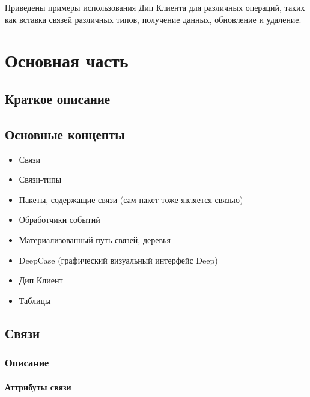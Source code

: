 \documentclass{article}
\begin{document}
Приведены примеры использования Дип Клиента для различных операций, таких как
вставка связей различных типов, получение данных, обновление и удаление.


\tableofcontents

\section{Основная часть}

\subsection{Краткое описание}

\subsection{Основные концепты}

\begin{itemize}
  \item Связи
  \item Связи-типы
  \item Пакеты, содержащие связи (сам пакет тоже является связью)
  \item Обработчики событий
  \item Материализованный путь связей, деревья
  \item DeepCase (графический визуальный интерфейс Deep)
  \item Дип Клиент
  \item Таблицы
\end{itemize}

\subsection{Связи}

\subsubsection{Описание}

\paragraph{Аттрибуты связи}
\end{document}

